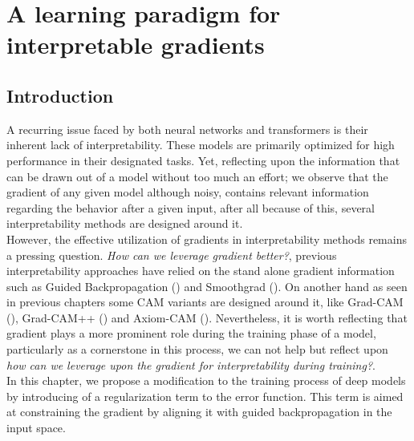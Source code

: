 \chapter{A learning paradigm for interpretable gradients}
\chaptertoc{}
\label{ch:grad}
\section{Introduction}
\label{sec:grad_intro}
\noindent A recurring issue faced by both neural networks and transformers is their inherent
lack of interpretability. These models are primarily optimized for high performance in their 
designated tasks. Yet, reflecting upon the information that can be drawn out of a 
model without too much an effort; we observe that the gradient of any given model although noisy,
contains relevant information regarding the behavior after a given input, after all because of this,
several interpretability methods are designed around it.\\

\noindent However,  the effective utilization of gradients in interpretability methods remains a 
pressing question. \textit{How can we leverage gradient better?}, previous interpretability 
approaches have relied on the stand alone gradient information such as Guided Backpropagation 
(\cite{guidedbackprop}) and Smoothgrad (\cite{smilkov2017smoothgrad}). On  another hand as 
seen in previous chapters some CAM variants are designed around it, like Grad-CAM 
(\cite{selvaraju2017grad}), Grad-CAM++ (\cite{chattopadhay2018grad}) and Axiom-CAM (\cite{axiombased}).
Nevertheless, it is worth reflecting that gradient plays a more prominent role during 
the training phase of a model, particularly as a cornerstone in this process, we can not help but
reflect upon \textit{how can we leverage upon the gradient for interpretability during training?}.\\

\noindent In this chapter, we propose a modification to the training process of deep models by 
introducing of a regularization term to the error function. This term is aimed at constraining 
the gradient by aligning it with guided backpropagation in the input space.








\newpage

